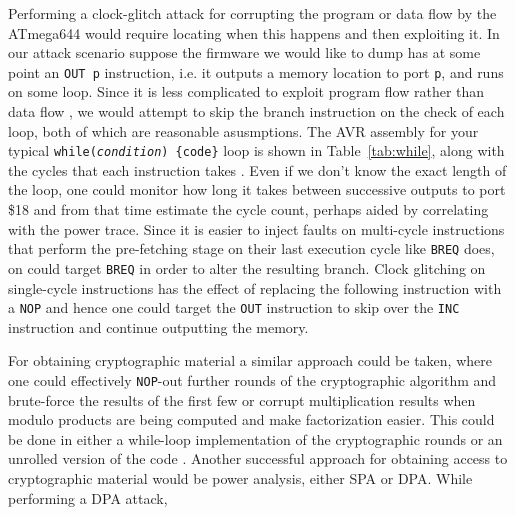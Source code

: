 Performing a clock-glitch attack for corrupting the program or data flow by the ATmega644 would require locating when this happens and then exploiting it. In our attack scenario suppose the firmware we would like to dump has at some point an \texttt{OUT p} instruction, i.e. it outputs a memory location to port \texttt{p}, and runs on some loop. Since it is less complicated to exploit program flow rather than data flow \citep{glitches_paper}, we would attempt to skip the branch instruction on the check of each loop, both of which are reasonable asusmptions. The AVR assembly for your typical  \texttt{while(\emph{condition}) \{code\}} loop is shown in Table~\ref{tab:while}, along with the cycles that each instruction takes \citep{atmega_manual}. Even if we don't know the exact length of the loop, one could monitor how long it takes between successive outputs to port \$18 and from that time estimate the cycle count, perhaps aided by correlating with the power trace. Since it is easier to inject faults on multi-cycle instructions that perform the pre-fetching stage on their last execution cycle \citep{glitches_paper} like \texttt{BREQ} does, on could target \texttt{BREQ} in order to alter the resulting branch. Clock glitching on single-cycle instructions has the effect of replacing the following instruction with a \texttt{NOP} \citep{glitches_paper} and hence one could target the \texttt{OUT} instruction to skip over the \texttt{INC} instruction and continue outputting the memory.

For obtaining cryptographic material a similar approach could be taken, where one could effectively \texttt{NOP}-out further rounds of the cryptographic algorithm and brute-force the results of the first few \citep{glitches_paper}\citep{sergei:thesis} or corrupt multiplication results when modulo products are being computed and make factorization easier\citep{anderson:cautionary_note}. This could be done in either a while-loop implementation of the cryptographic rounds or an unrolled version of the code \citep{glitches_paper}. Another successful approach for obtaining access to cryptographic material would be power analysis, either SPA or DPA. While performing a DPA attack,  

